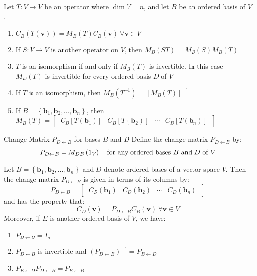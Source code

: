 \documentclass[12pt]{article}
\begin{document}
\begin{theorem}{}{}
    Let $ T : V \to V $ be an operator where $ \dim V = n $, and let $ B $ be an ordered basis of $ V $.
    \begin{enumerate}[label=(\roman*)]
        \item $ C_B \left( T \left( \mathbf{v} \right) \right) = M_B \left( T \right) C_B \left( \mathbf{v} \right) \ \forall \mathbf{v} \in V $
        \item If $ S : V \to V $ is another operator on $ V $, then $ M_B \left( ST \right) = M_B \left( S \right) M_B \left( T \right) $
        \item $ T $ is an isomorphism if and only if $ M_B \left( T \right) $ is invertible. In this case $ M_D \left( T \right) $ is invertible for every ordered basis $ D $ of $ V $
        \item If $ T $ is an isomorphism, then $ M_B \left( T^{-1} \right) = \left[ M_B \left( T \right) \right]^{-1} $
        \item If $ B = \left\{ \mathbf{b}_1, \mathbf{b}_2, \dots, \mathbf{b}_n \right\} $, then $ M_B \left( T \right) = \begin{bmatrix} \ C_B \left[ T \left( \mathbf{b}_1 \right) \right] & C_B \left[ T \left( \mathbf{b}_2 \right) \right] & \cdots & C_B \left[ T \left( \mathbf{b}_n \right) \right] \ \end{bmatrix} $
    \end{enumerate}
\end{theorem}

\begin{definition}{Change Matrix $ P_{D \leftarrow B} $ for bases $ B $ and $ D $}{}
    Define the change matrix $ P_{D \leftarrow B} $ by:
    \[ P_{D \leftarrow B} = M_{DB} \left( 1_V \right) \quad \text{for any ordered bases $ B $ and $ D $ of $ V $} \]
\end{definition}

\begin{theorem}{}{}
    Let $ B = \left\{ \mathbf{b}_1, \mathbf{b}_2, \dots, \mathbf{b}_n \right\} $ and $ D $ denote ordered bases of a vector space $ V $. Then the change matrix $ P_{D \leftarrow B} $ is given in terms of its columns by:
    \[ P_{D \leftarrow B} = \begin{bmatrix} \ C_D \left( \mathbf{b}_1 \right) & C_D \left( \mathbf{b}_2 \right) & \cdots & C_D \left( \mathbf{b}_n \right) \ \end{bmatrix} \]
    and has the property that:
    \[ C_D \left( \mathbf{v} \right) = P_{D \leftarrow B} C_B \left( \mathbf{v} \right) \ \forall \mathbf{v} \in V \]
    Moreover, if $ E $ is another ordered basis of $ V $, we have:
    \begin{enumerate}[label=(\roman*)]
        \item $ P_{B \leftarrow B} = I_n $
        \item $ P_{D \leftarrow B} $ is invertible and $ \left( P_{D \leftarrow B} \right)^{-1} = P_{B \leftarrow D} $
        \item $ P_{E \leftarrow D} P_{D \leftarrow B} = P_{E \leftarrow B} $
    \end{enumerate}
\end{theorem}
\end{document}
